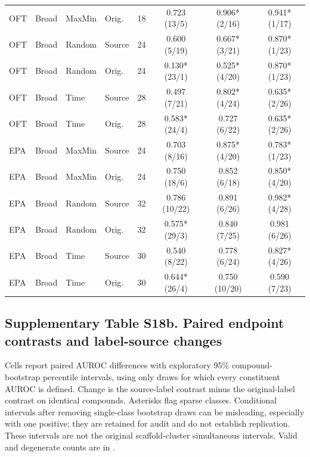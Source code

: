 \begin{longtable}{llllrccc}
OFT & Broad & MaxMin & Orig. & 18 & 0.723 (13/5) & 0.906* (2/16) & 0.941* (1/17) \\
OFT & Broad & Random & Source & 24 & 0.600 (5/19) & 0.667* (3/21) & 0.870* (1/23) \\
OFT & Broad & Random & Orig. & 24 & 0.130* (23/1) & 0.525* (4/20) & 0.870* (1/23) \\
OFT & Broad & Time & Source & 28 & 0.497 (7/21) & 0.802* (4/24) & 0.635* (2/26) \\
OFT & Broad & Time & Orig. & 28 & 0.583* (24/4) & 0.727 (6/22) & 0.635* (2/26) \\
EPA & Broad & MaxMin & Source & 24 & 0.703 (8/16) & 0.875* (4/20) & 0.783* (1/23) \\
EPA & Broad & MaxMin & Orig. & 24 & 0.750 (18/6) & 0.852 (6/18) & 0.850* (4/20) \\
EPA & Broad & Random & Source & 32 & 0.786 (10/22) & 0.891 (6/26) & 0.982* (4/28) \\
EPA & Broad & Random & Orig. & 32 & 0.575* (29/3) & 0.840 (7/25) & 0.981 (6/26) \\
EPA & Broad & Time & Source & 30 & 0.540 (8/22) & 0.778 (6/24) & 0.827* (4/26) \\
EPA & Broad & Time & Orig. & 30 & 0.644* (26/4) & 0.750 (10/20) & 0.590 (7/23) \\

\end{longtable}\endgroup

\subsection*{Supplementary Table S18b. Paired endpoint contrasts and label-source changes}

Cells report paired AUROC differences with exploratory 95\% compound-bootstrap percentile intervals, using only draws for which every constituent AUROC is defined. Change is the source-label contrast minus the original-label contrast on identical compounds. Asterisks flag sparse classes. Conditional intervals after removing single-class bootstrap draws can be misleading, especially with one positive; they are retained for audit and do not establish replication. These intervals are not the original scaffold-cluster simultaneous intervals. Valid and degenerate counts are in .

\begingroup\small\setlength{\tabcolsep}{4pt}

